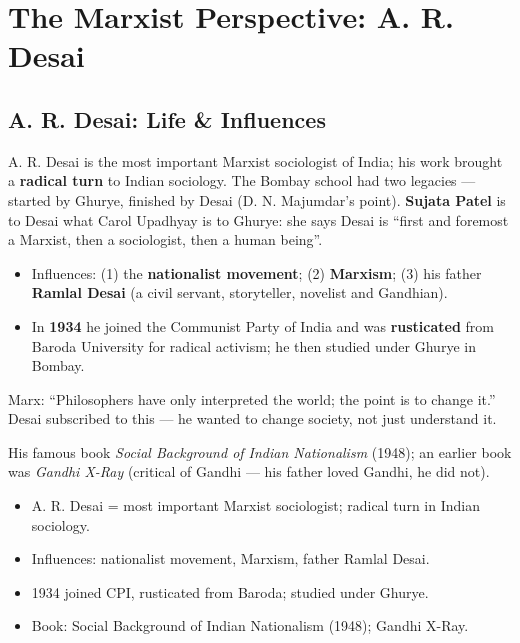 \chapter{The Marxist Perspective: A. R. Desai}

\section{A. R. Desai: Life \& Influences}

A. R. Desai is the most important Marxist sociologist of India; his work brought a \textbf{radical turn} to Indian sociology. The Bombay school had two legacies --- started by Ghurye, finished by Desai (D. N. Majumdar's point). \textbf{Sujata Patel} is to Desai what Carol Upadhyay is to Ghurye: she says Desai is ``first and foremost a Marxist, then a sociologist, then a human being''.

\begin{itemize}
\item Influences: (1) the \textbf{nationalist movement}; (2) \textbf{Marxism}; (3) his father \textbf{Ramlal Desai} (a civil servant, storyteller, novelist and Gandhian).
\item In \textbf{1934} he joined the Communist Party of India and was \textbf{rusticated} from Baroda University for radical activism; he then studied under Ghurye in Bombay.
\end{itemize}

\begin{KeyConcept}
Marx: ``Philosophers have only interpreted the world; the point is to change it.'' Desai subscribed to this --- he wanted to change society, not just understand it.
\end{KeyConcept}

His famous book \emph{Social Background of Indian Nationalism} (1948); an earlier book was \emph{Gandhi X-Ray} (critical of Gandhi --- his father loved Gandhi, he did not).

\begin{QuickRevision}
\begin{itemize}
\item A. R. Desai = most important Marxist sociologist; radical turn in Indian sociology.
\item Influences: nationalist movement, Marxism, father Ramlal Desai.
\item 1934 joined CPI, rusticated from Baroda; studied under Ghurye.
\item Book: Social Background of Indian Nationalism (1948); Gandhi X-Ray.
\end{itemize}
\end{QuickRevision}

